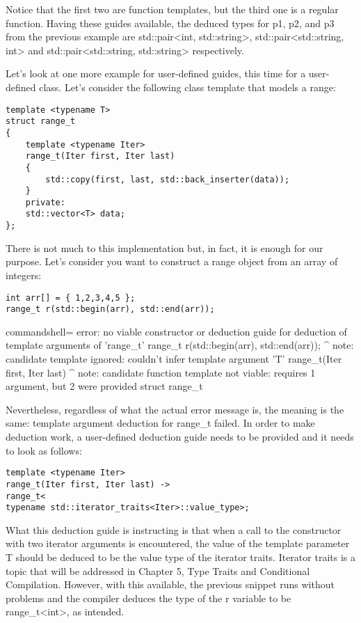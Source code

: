 Notice that the first two are function templates, but the third one is a regular function. Having these guides available, the deduced types for p1, p2, and p3 from the previous example are std::pair<int, std::string>, std::pair<std::string, int> and std::pair<std::string, std::string> respectively.

Let’s look at one more example for user-defined guides, this time for a user-defined class. Let’s consider the following class template that models a range:

\begin{lstlisting}[style=styleCXX]
template <typename T>
struct range_t
{
	template <typename Iter>
	range_t(Iter first, Iter last)
	{
		std::copy(first, last, std::back_inserter(data));
	}
	private:
	std::vector<T> data;
};
\end{lstlisting}

There is not much to this implementation but, in fact, it is enough for our purpose. Let’s consider you want to construct a range object from an array of integers:

\begin{lstlisting}[style=styleCXX]
int arr[] = { 1,2,3,4,5 };
range_t r(std::begin(arr), std::end(arr));
\end{lstlisting}

\begin{tcblisting}{commandshell={}}
error: no viable constructor or deduction guide for deduction
of template arguments of 'range_t'
range_t r(std::begin(arr), std::end(arr));
         ^
note: candidate template ignored: couldn't infer template
argument 'T'
range_t(Iter first, Iter last)
         ^
note: candidate function template not viable: requires 1
argument, but 2 were provided
struct range_t
\end{tcblisting}

Nevertheless, regardless of what the actual error message is, the meaning is the same: template argument deduction for range\_t failed. In order to make deduction work, a user-defined deduction guide needs to be provided and it needs to look as follows:

\begin{lstlisting}[style=styleCXX]
template <typename Iter>
range_t(Iter first, Iter last) ->
range_t<
typename std::iterator_traits<Iter>::value_type>;
\end{lstlisting}

What this deduction guide is instructing is that when a call to the constructor with two iterator arguments is encountered, the value of the template parameter T should be deduced to be the value type of the iterator traits. Iterator traits is a topic that will be addressed in Chapter 5, Type Traits and Conditional Compilation. However, with this available, the previous snippet runs without problems and the compiler deduces the type of the r variable to be range\_t<int>, as intended.


